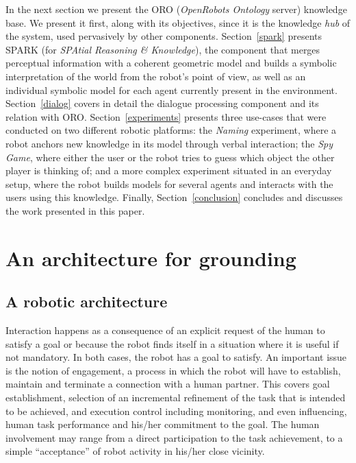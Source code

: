 \documentclass{svmult}
\begin{document}
In the next section we present the {\sc ORO}
(\emph{OpenRobots Ontology} server) knowledge base. We present it first, along with its objectives,
since it is the knowledge \textit{hub} of the system, used pervasively by other
components.
Section~\ref{spark} presents {\sc SPARK} (for \emph{SPAtial Reasoning \& Knowledge}), the
component that merges perceptual information with a coherent geometric model and
builds a symbolic interpretation of the world from the robot's point of view,
as well as an individual symbolic model for each agent currently present in the
environment. 
Section~\ref{dialog} covers in detail the dialogue processing component and its 
relation with ORO.
Section~\ref{experiments} presents three use-cases that were conducted on two 
different robotic platforms: the \emph{Naming} experiment, where a robot anchors new
knowledge in its model through verbal interaction; the \emph{Spy Game}, where
either the user or the robot tries to guess which object the other player is
thinking of; and a more complex experiment situated in an everyday setup, where
the robot builds models for several agents and interacts with the users using
this knowledge. 
Finally, Section~\ref{conclusion} concludes and discusses the work presented 
in this paper.







\section{An architecture for grounding}
\label{sec:Framework}

\subsection{A robotic architecture}

Interaction happens as a consequence of an explicit request of the
human to satisfy a goal or because the robot finds itself in a
situation where it is useful if not mandatory. In both cases, the
robot has a goal to satisfy.  An important issue is the notion of
engagement, a process in which the robot will have to establish,
maintain and terminate a connection with a human partner. 
This covers goal establishment, selection of an incremental refinement
of the task that is intended to be achieved, and execution control
including monitoring, and even influencing, human task performance and
his/her commitment to the goal. The human involvement may range from a
direct participation to the task achievement, to a simple
``acceptance'' of robot activity in his/her close vicinity.
 
\end{document}
